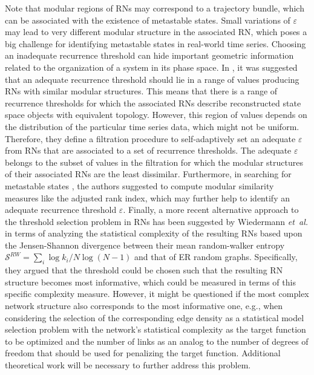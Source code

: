 		 Note that modular regions of RNs may correspond to a trajectory bundle, which can be associated with the existence of metastable states. Small variations of $\varepsilon$ may lead to very different modular structure in the associated RN, which poses a big challenge for identifying metastable states in real-world time series. Choosing an inadequate recurrence threshold can hide important geometric information related to the organization of a system in its phase space. In \cite{Vega2016}, it was suggested that an adequate recurrence threshold should lie in a range of values producing RNs with similar modular structures. This means that there is a range of recurrence thresholds for which the associated RNs describe reconstructed state space objects with equivalent topology. However, this region of values depends on the distribution of the particular time series data, which might not be uniform. Therefore, they define a filtration procedure to self-adaptively set an adequate $\varepsilon$ from RNs that are associated to a set of recurrence thresholds. The adequate $\varepsilon$ belongs to the subset of values in the filtration for which the modular structures of their associated RNs are the least dissimilar. Furthermore, in searching for metastable states \cite{Vega2016}, the authors suggested to compute modular similarity measures like the adjusted rank index, which may further help to identify an adequate recurrence threshold $\varepsilon$. 
Finally, a more recent alternative approach to the threshold selection problem in RNs has been suggested by Wiedermann \emph{et~al.} \cite{Wiedermann2017} in terms of analyzing the statistical complexity of the resulting RNs based upon the Jensen-Shannon divergence between their mean random-walker entropy $\mathcal{S}^{RW}=\sum_{i} \log k_i /N\log(N-1)$ and that of ER random graphs. Specifically, they argued that the threshold could be chosen such that the resulting RN structure becomes most informative, which could be measured in terms of this specific complexity measure. However, it might be questioned if the most complex network structure also corresponds to the most informative one, e.g., when considering the selection of the corresponding edge density as a statistical model selection problem with the network's statistical complexity as the target function to be optimized and the number of links as an analog to the number of degrees of freedom that should be used for penalizing the target function. Additional theoretical work will be necessary to further address this problem.


